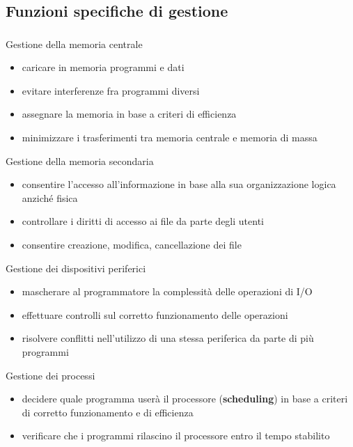 \documentclass{beamer}
\newenvironment{mainframe}{
	\begin{frame}
		\frametitle{\insertsubsection}
		\framesubtitle{\insertsection}
	}{
	\end{frame}
}
\begin{document}
\subsection{Funzioni specifiche di gestione}
\begin{mainframe}
	\begin{block}{Gestione della memoria centrale}
		\begin{itemize}
			\item caricare in memoria programmi e dati
			\item evitare interferenze fra programmi diversi
			\item assegnare la memoria in base a criteri di efficienza
			\item minimizzare i trasferimenti tra memoria centrale e memoria di massa
		\end{itemize}
	\end{block}
\end{mainframe}
\begin{frame}
	\begin{block}{Gestione della memoria secondaria}
		\begin{itemize}
			\item consentire l'accesso all'informazione in base alla sua organizzazione logica anziché fisica
			\item controllare i diritti di accesso ai file da parte degli utenti
			\item consentire creazione, modifica, cancellazione dei file
		\end{itemize}
	\end{block}
	\begin{block}{Gestione dei dispositivi periferici}
		\begin{itemize}
			\item mascherare al programmatore la complessità delle operazioni di I/O
			\item effettuare controlli sul corretto funzionamento delle operazioni
			\item risolvere conflitti nell'utilizzo di una stessa periferica da parte di più programmi
		\end{itemize}
	\end{block}
\end{frame}
\begin{frame}
	\begin{block}{Gestione dei processi}
		\begin{itemize}
			\item decidere quale programma userà il processore (\textbf{scheduling}) in base a criteri di corretto funzionamento e di efficienza
			\item verificare che i programmi rilascino il processore entro il tempo stabilito
		\end{itemize}
	\end{block}
\end{frame}
\end{document}
